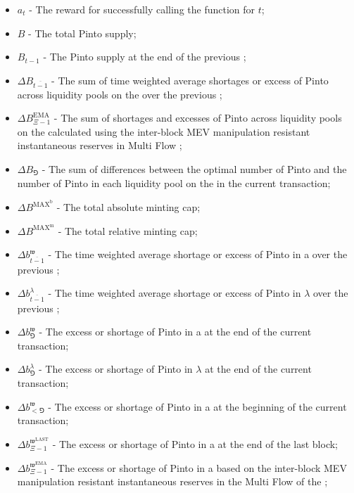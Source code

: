 \documentclass[class=article, crop=false]{standalone}
\begin{document}
\begin{itemize}[topsep=0pt, itemsep=3pt,leftmargin=16pt]
    \item[] $a_{t}$ - The reward for successfully calling the  function for $t$;
    \item[] $B$ - The total Pinto supply;
    \item[] $B_{t-1}$ - The Pinto supply at the end of the previous ;
    \item[] $\Delta B_{\overline{t-1}}$ - The sum of time weighted average shortages or excess of Pinto across liquidity pools on the  over the previous ;
    \item[] $\Delta B_{\Xi-1}^{\text{EMA}}$ - The sum of shortages and excesses of Pinto across liquidity pools on the  calculated using the inter-block MEV manipulation resistant instantaneous reserves in Multi Flow ;
    \item[] $\Delta B_{\Game}$ - The sum of differences between the optimal number of Pinto and the number of Pinto in each liquidity pool on the  in the current transaction;
    \item[] $\Delta B^{\text{MAX}^{\text{b}}}$ - The total absolute minting cap;
    \item[] $\Delta B^{\text{MAX}^{\text{m}}}$ - The total relative minting cap;
    \item[] $\Delta b_{\overline{t-1}}^{\mathfrak{w}}$ - The time weighted average shortage or excess of Pinto in a  over the previous ;
    \item[] $\Delta b_{\overline{t-1}}^{\lambda}$ - The time weighted average shortage or excess of Pinto in $\lambda$ over the previous ;
    \item[] $\Delta b_{\Game}^{\mathfrak{w}}$ - The excess or shortage of Pinto in a  at the end of the current transaction;
    \item[] $\Delta b_{\Game}^{\lambda}$ - The excess or shortage of Pinto in $\lambda$ at the end of the current transaction;
    \item[] $\Delta b_{<\Game}^{\mathfrak{w}}$ - The excess or shortage of Pinto in a  at the beginning of the current transaction;
    \item[] $\Delta b_{\Xi-1}^{\mathfrak{w}^{\text{LAST}}}$ - The excess or shortage of Pinto in a  at the end of the last block;
    \item[] $\Delta b_{\Xi-1}^{\mathfrak{w}^{\text{EMA}}}$ - The excess or shortage of Pinto in a  based on the inter-block MEV manipulation resistant instantaneous reserves in the Multi Flow  of the ;

\end{itemize}
\end{document}
